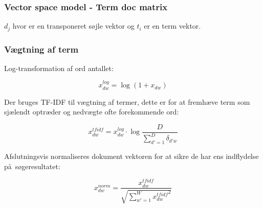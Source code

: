 \documentclass[xcolor=table]{beamer}
\begin{document}
\begin{frame}

  \frametitle{Vector space model - Term doc matrix}


  \begin{center}
  \end{center}

  $d_j$ hvor er en transponeret s\o jle vektor og $t_i$ er en term vektor.

\end{frame}

\begin{frame}

  \frametitle{V\ae gtning af term}

  Log-transformation af ord antallet:

  \[
  x_{dw}^{log} = \log{(1 + x_{dw})}
  \]

  Der bruges TF-IDF til v\ae gtning af termer, dette er for at fremh\ae ve term som sj\ae lendt optr\ae der og nedv\ae gte ofte forekommende ord:

  \[
  x_{dw}^{tfidf} = x_{dw}^{log} \cdot \log{\frac{D}{\sum_{d\prime = 1}^{D}\delta_{d\prime w}}}
  \]

  Afslutningsvis normaliseres dokument vektoren for at sikre de har ens indflydelse p\aa\ s\o geresultatet:

  \[
  x_{dw}^{norm} = \frac{x_{dw}^{tfidf}}{\sqrt{\sum_{w\prime = 1}^{W} {x_{dw}^{tfidf}}^{2}}}
  \]

\end{frame}
\end{document}
